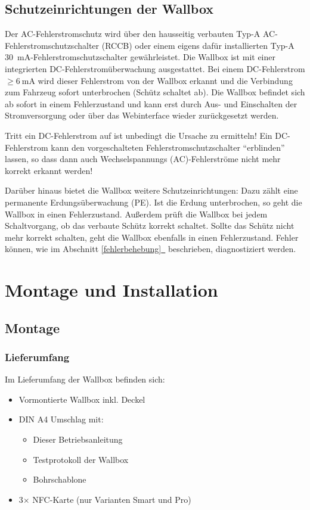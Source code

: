 \documentclass[a4paper,10pt]{article}
\newcommand{\hint}[1]{\begin{tcolorbox}[colback=boxgray,colframe=black,coltext=
white,title=Hinweis,left*=2mm,right*=2mm,boxsep=1mm,bottom=1mm,top=1mm]#1\end{tcolorbox}}
\newcommand*{\fullref}[1]{Abschnitt \hyperref[{#1}]{\ref*{#1}~\nameref*{#1}}}
\begin{document}
\begin{multicols*}{2}
    \subsection{Schutzeinrichtungen der Wallbox}\label{dcerrorhint}
    Der AC-Fehlerstromschutz wird über den hausseitig verbauten
    Typ-A AC-Fehlerstromschutzschalter (RCCB) oder einem eigens dafür installierten
    Typ-A \SI{30}{\milli\ampere}-Fehlerstromschutzschalter gewährleistet. Die Wallbox ist
    mit einer integrierten DC-Fehlerstromüberwachung ausgestattet.
    Bei einem DC-Fehlerstrom $\geq \SI{6}{\milli\ampere}$ wird dieser
    Fehlerstrom von der Wallbox erkannt und die Verbindung zum Fahrzeug sofort
    unterbrochen (Schütz schaltet ab). Die Wallbox befindet sich ab sofort in einem
    Fehlerzustand und kann erst durch Aus- und Einschalten der
    Stromversorgung oder über das Webinterface wieder zurückgesetzt werden.
    \hint{Tritt ein DC-Fehlerstrom auf ist unbedingt die Ursache zu
    ermitteln! Ein DC-Fehlerstrom kann den vorgeschalteten Fehlerstromschutzschalter
    \enquote{erblinden} lassen, so dass dann auch Wechselspannungs
    (AC)-Fehlerströme nicht mehr korrekt erkannt werden!}

    Darüber hinaus bietet die Wallbox weitere Schutzeinrichtungen: Dazu zählt eine
    permanente Erdungsüberwachung (PE). Ist die Erdung unterbrochen, so geht die
    Wallbox in einen Fehlerzustand. Außerdem prüft die Wallbox bei jedem
    Schaltvorgang, ob das verbaute Schütz korrekt schaltet. Sollte das
    Schütz nicht mehr korrekt schalten, geht die Wallbox ebenfalls in einen Fehlerzustand.
    Fehler können, wie im \fullref{fehlerbehebung} beschrieben, diagnostiziert werden.

    \newpage
    \section{Montage und Installation}
    \subsection{Montage}
    \subsubsection{Lieferumfang}
    Im Lieferumfang der Wallbox befinden sich:
    \begin{itemize}
        \item Vormontierte Wallbox inkl. Deckel
        \item DIN A4 Umschlag mit:
        \begin{itemize}
            \item Dieser Betriebsanleitung
            \item Testprotokoll der Wallbox
            \item Bohrschablone
        \end{itemize}
        \item 3$\times$ NFC-Karte (nur Varianten Smart und Pro)
    \end{itemize}


\end{multicols*}
\end{document}
